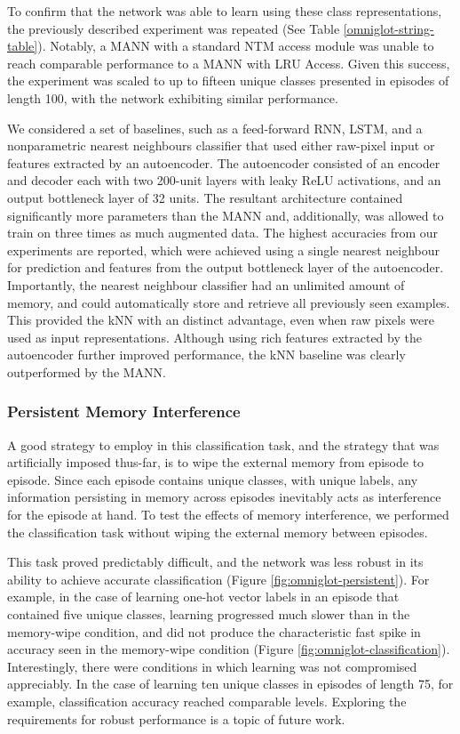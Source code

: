 \documentclass{article}
\begin{document}
To confirm that the network was able to learn using these class representations, the previously described experiment was repeated (See Table \ref{omniglot-string-table}). Notably, a MANN with a standard NTM access module was unable to reach comparable performance to a MANN with LRU Access. Given this success, the experiment was scaled to up to fifteen unique classes presented in episodes of length 100, with the network exhibiting similar performance. 

We considered a set of baselines, such as a feed-forward RNN, LSTM, and a nonparametric nearest neighbours classifier that used either raw-pixel input or features extracted by an autoencoder. The autoencoder consisted of an encoder and decoder each with two 200-unit layers with leaky ReLU activations, and an output bottleneck layer of 32 units. The resultant architecture contained significantly more parameters than the MANN and, additionally, was allowed to train on three times as much augmented data. The highest accuracies from our experiments are reported, which were achieved using a single nearest neighbour for prediction and features from the output bottleneck layer of the autoencoder. Importantly, the nearest neighbour classifier had an unlimited amount of memory, and could automatically store and retrieve all previously seen examples. This provided the kNN with an distinct advantage, even when raw pixels were used as input representations. Although using rich features extracted by the autoencoder further improved performance, the kNN baseline was clearly outperformed by the MANN.

\subsubsection{Persistent Memory Interference}
A good strategy to employ in this classification task, and the strategy that was artificially imposed thus-far, is to wipe the external memory from episode to episode. Since each episode contains unique classes, with unique labels, any information persisting in memory across episodes inevitably acts as interference for the episode at hand. To test the effects of memory interference, we performed the classification task without wiping the external memory between episodes. 

This task proved predictably difficult, and the network was less robust in its ability to achieve accurate classification (Figure \ref{fig:omniglot-persistent}). For example, in the case of learning one-hot vector labels in an episode that contained five unique classes, learning progressed much slower than in the memory-wipe condition, and did not produce the characteristic fast spike in accuracy seen in the memory-wipe condition (Figure \ref{fig:omniglot-classification}). Interestingly, there were conditions in which learning was not compromised appreciably. In the case of learning ten unique classes in episodes of length 75, for example, classification accuracy reached comparable levels. Exploring the requirements for robust performance is a topic of future work.
\end{document}

